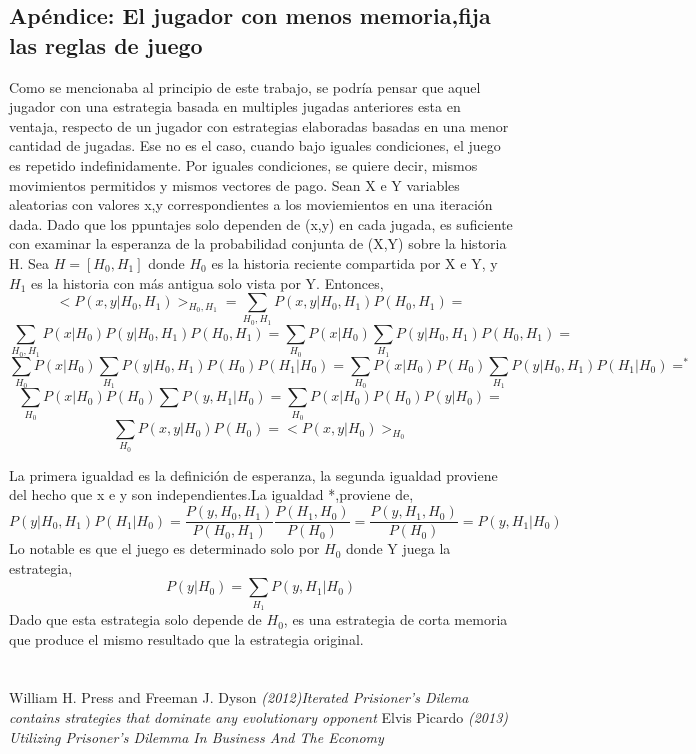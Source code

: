 \documentclass[12pt]{article}
\begin{document}
\subsection{Apéndice: El jugador con menos memoria,fija las reglas de juego}
Como se mencionaba al principio de este trabajo, se podría pensar que aquel jugador
con una estrategia basada en multiples jugadas anteriores esta en ventaja, respecto de 
un jugador con estrategias elaboradas basadas en una menor cantidad de jugadas.
Ese no es el caso, cuando bajo iguales condiciones, el juego es repetido  indefinidamente.
Por iguales condiciones, se quiere decir, mismos movimientos permitidos y mismos vectores
de pago.
Sean X e Y variables aleatorias con valores x,y correspondientes a los moviemientos en una iteración dada.
Dado que los ppuntajes solo dependen de (x,y) en cada jugada, es suficiente con examinar la esperanza
de la probabilidad conjunta de  (X,Y) sobre la historia H.
Sea $H=[H_0,H_1]$ donde $H_0$ es la historia reciente compartida por X e Y, y $H_1$ es la historia con más antigua
solo vista por Y. Entonces,
$$<P(x,y|H_0,H_1)>_{H_0,H_1}=\sum_{H_0,H_1}P(x,y|H_0,H_1) P(H_0,H_1)=$$
$$\sum_{H_0,H_1} P(x|H_0)P(y|H_0,H_1)P(H_0,H_1)=\sum_{H_0} P(x|H_0) \sum_{H_1} P(y|H_0,H_1)P(H_0,H_1)=$$
$$\sum_{H_0}P(x|H_0)\sum_{H_1}P(y|H_0,H_1)P(H_0)P(H_1|H_0) =\sum_{H_0}P(x|H_0)P(H_0) \sum_{H_1}P(y|H_0,H_1)P(H_1|H_0)=^*$$
$$\sum_{H_0}P(x|H_0)P(H_0)\sum P(y,H_1|H_0)=\sum_{H_0}P(x|H_0)P(H_0)P(y|H_0)=$$
$$\sum_{H_0}P(x,y|H_0)P(H_0)=<P(x,y|H_0)>_{H_0} $$

La primera igualdad es la definición de esperanza, la segunda igualdad proviene del hecho que x e y son independientes.La 
igualdad *,proviene de,
$$P(y|H_0,H_1)P(H_1|H_0)=\frac{P(y,H_0,H_1)}{P(H_0,H_1)} \frac{P(H_1,H_0)}{P(H_0)}=\frac{P(y,H_1,H_0)}{P(H_0)}=P(y,H_1|H_0)$$
Lo notable es que el juego es determinado solo por $H_0$ donde Y juega la estrategia,
$$P(y|H_0)=\sum_{H_1}P(y,H_1|H_0)$$
Dado que esta estrategia solo depende de $H_0$, es una estrategia de corta memoria que produce el mismo
resultado que la estrategia original.


\newpage
 \section{}
  \begin{thebibliography}{1}
  \bibitem{}  William H. Press and Freeman J. Dyson {\em (2012)Iterated Prisioner's Dilema contains strategies that dominate any evolutionary opponent}
  \bibitem{}  Elvis Picardo {\em (2013) Utilizing Prisoner’s Dilemma In Business And The Economy }
  \end{thebibliography}
\end{document}
